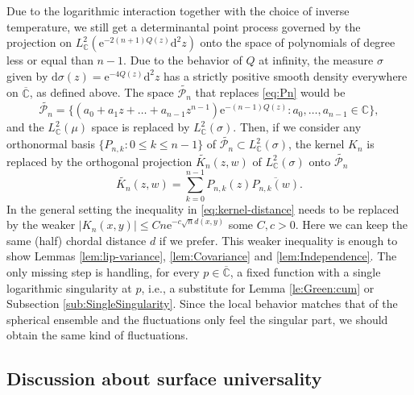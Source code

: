 \documentclass[10pt,reqno]{amsart}
\numberwithin{equation}{section}
\numberwithin{figure}{section}
\theoremstyle{plain}
\newcommand{\<}{\langle}
\renewcommand{\>}{\rangle}
\begin{document}
Due to the logarithmic interaction
together with the choice of inverse temperature,
we still get a determinantal point process
governed by the projection
on $L^2_{\mathbb C}(\mathrm{e}^{-2(n+1)Q(z)} \mathrm d^2 z )$
onto the space of polynomials
of degree less or equal than $n-1$. Due to the
behavior of $Q$ at infinity, the 
measure $\sigma$ given by $\mathrm d \sigma(z) = 
\mathrm{e}^{-4Q(z)} \mathrm d^2 z $
has a strictly positive smooth density everywhere
on $\overline{\mathbb C}$,
as defined above. The space
$\widetilde {\mathcal P_n}$ that replaces \eqref{eq:Pn}
would be
\begin{equation}\label{eq:Pn:replace}
    \widetilde{\mathcal P_n} = 
    \bigg\{(a_0 + a_1 z+ \dots + a_{n-1}z^{n-1})\mathrm{e}^{-(n-1)Q(z)}:
	a_0,\dots,a_{n-1} \in \mathbb C\bigg\},
\end{equation}
and the $L^2_{\mathbb C}(\mu)$ space is replaced by 
$L^2_{\mathbb C}(\sigma)$. Then, 
if we consider any orthonormal basis $\{P_{n,k}: 0 \leq k \leq n-1 \}$ of $\widetilde{\mathcal P_n}
\subset L^2_{\mathbb C}(\sigma)$, the kernel
$K_n$ is replaced by the orthogonal projection 
$\widetilde {K_n}(z,w)$
of $L^2_{\mathbb C}(\sigma)$ onto
$\widetilde {\mathcal P_n}$
\[\widetilde {K_n}(z,w)
= \sum_{k=0}^{n-1} P_{n,k}(z) \overline{P_{n,k}(w)}.\]
In the general setting
the inequality in \eqref{eq:kernel-distance}
needs to be replaced by the weaker
$|K_n(x,y)|\leq Cn\mathrm{e}^{-c\sqrt{n}d(x,y)}$
some $C,c>0$. Here we can keep the same (half) chordal
distance $d$ if we prefer.
This weaker inequality is enough to show 
Lemmas
\ref{lem:lip-variance}, \ref{lem:Covariance} and \ref{lem:Independence}. The only missing step
is handling, for every $p \in \overline{\mathbb C}$, a fixed function with a single
logarithmic singularity at $p$,
i.e., a substitute for Lemma \ref{le:Green:cum}
or Subsection \ref{sub:SingleSingularity}. 
Since the local behavior matches that of
the spherical ensemble
and the fluctuations only feel the
singular part,
 we should obtain the same kind of fluctuations.

\subsection{Discussion about surface universality}
\label{se:Surface}
\end{document}
